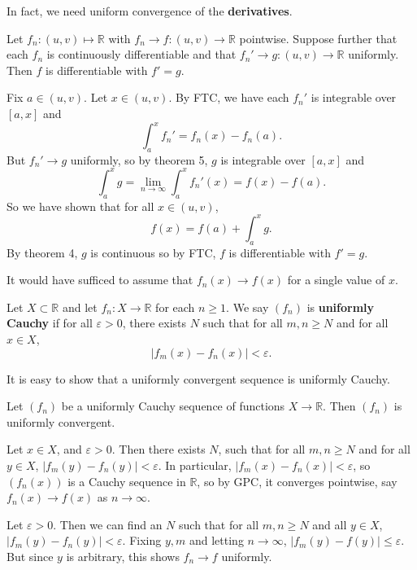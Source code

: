 \documentclass[12pt]{article}
\begin{document}
In fact, we need uniform convergence of the \textbf{derivatives}.

\begin{theorem}
	Let $f_n : (u, v) \mapsto \mathbb{R}$ with $f_n \to f : (u, v) \to \mathbb{R}$ pointwise. Suppose further that each $f_n$ is continuously differentiable and that $f_n' \to g : (u, v) \to \mathbb{R}$ uniformly. Then $f$ is differentiable with $f' = g$.
\end{theorem}

\begin{proofbox}
	Fix $a \in (u, v)$. Let $x \in (u, v)$. By FTC, we have each $f_n'$ is integrable over $[a, x]$ and
	\[
		\int_{a}^{x}f_n' = f_n(x) - f_n(a)
	.\]
	But $f_n' \to g$ uniformly, so by theorem 5, $g$ is integrable over $[a, x]$ and
	\[
		\int_{a}^{x}g = \lim_{n \to \infty} \int_{a}^{x} f_n' (x) = f(x) - f(a)
	.\]
	So we have shown that for all $x \in (u, v)$,
	\[
		f(x) = f(a) + \int_{a}^{x} g
	.\]
	By theorem 4, $g$ is continuous so by FTC, $f$ is differentiable with $f' = g$.
\end{proofbox}

\begin{remark}
	It would have sufficed to assume that $f_n(x) \to f(x)$ for a single value of $x$.
\end{remark}

\begin{definition}
	Let $X \subset \mathbb{R}$ and let $f_n : X \to \mathbb{R}$ for each $n \geq 1$. We say $(f_n)$ is \textbf{uniformly Cauchy} if for all $\varepsilon > 0$, there exists $N$ such that for all $m, n \geq N$ and for all $x \in X$,
	\[
		|f_m(x) - f_n(x)| < \varepsilon
	.\]
\end{definition}
It is easy to show that a uniformly convergent sequence is uniformly Cauchy.

\begin{theorem}
	Let $(f_n)$ be a uniformly Cauchy sequence of functions $X \to \mathbb{R}$. Then $(f_n)$ is uniformly convergent.
\end{theorem}

\begin{proofbox}
	Let $x \in X$, and $\varepsilon > 0$. Then there exists $N$, such that for all $m, n \geq N$ and for all $y \in X$, $|f_m(y) - f_n(y)| < \varepsilon$. In particular, $|f_m(x) - f_n(x)| < \varepsilon$, so $(f_n(x))$ is a Cauchy sequence in $\mathbb{R}$, so by GPC, it converges pointwise, say $f_n(x) \to f(x)$ as $n \to \infty$.

	Let $\varepsilon > 0$. Then we can find an $N$ such that for all $m, n \geq N$ and all $y \in X$, $|f_m(y) - f_n(y)| < \varepsilon$. Fixing $y, m$ and letting $n \to \infty$, $|f_m(y) - f(y)| \leq \varepsilon$. But since $y$ is arbitrary, this shows $f_n \to f$ uniformly.
\end{proofbox}
\end{document}
